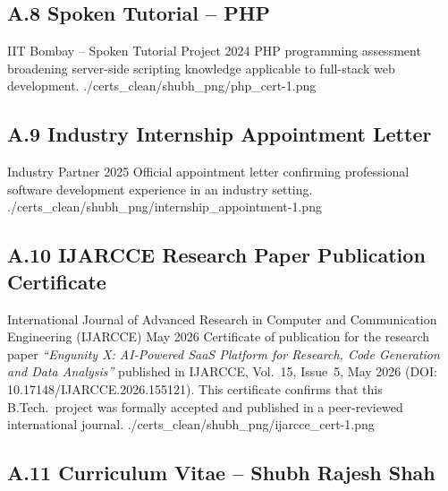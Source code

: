 \subsection*{A.8 \quad Spoken Tutorial -- PHP}

\certentry
  {IIT Bombay -- Spoken Tutorial Project}
  {2024}
  {PHP programming assessment broadening server-side scripting knowledge
   applicable to full-stack web development.}
  {./certs_clean/shubh_png/php_cert-1.png}

\subsection*{A.9 \quad Industry Internship Appointment Letter}

\certentry
  {Industry Partner}
  {2025}
  {Official appointment letter confirming professional software development
   experience in an industry setting.}
  {./certs_clean/shubh_png/internship_appointment-1.png}

\subsection*{A.10 \quad IJARCCE Research Paper Publication Certificate}

\certentry
  {International Journal of Advanced Research in Computer and Communication Engineering (IJARCCE)}
  {May 2026}
  {Certificate of publication for the research paper \textit{``Engunity X: AI-Powered SaaS Platform
   for Research, Code Generation and Data Analysis''} published in IJARCCE,
   Vol.~15, Issue~5, May 2026 (DOI: 10.17148/IJARCCE.2026.155121).
   This certificate confirms that this B.Tech.~project was formally accepted
   and published in a peer-reviewed international journal.}
  {./certs_clean/shubh_png/ijarcce_cert-1.png}

\clearpage
\subsection*{A.11 \quad Curriculum Vitae -- Shubh Rajesh Shah}

